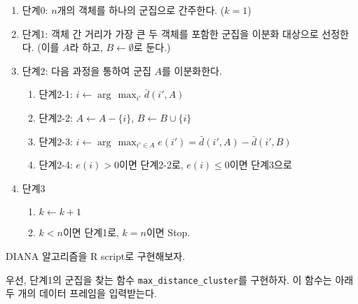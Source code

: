 \documentclass[
]{book}
\providecommand{\tightlist}{%
  \setlength{\itemsep}{0pt}\setlength{\parskip}{0pt}}
\begin{document}
\begin{enumerate}
\def\labelenumi{\arabic{enumi}.}
\tightlist
\item
  단계0: \(n\)개의 객체를 하나의 군집으로 간주한다. (\(k = 1\))
\item
  단계1: 객체 간 거리가 가장 큰 두 객체를 포함한 군집을 이분화 대상으로 선정한다. (이를 \(A\)라 하고, \(B \leftarrow \emptyset\)로 둔다.)
\item
  단계2: 다음 과정을 통하여 군집 \(A\)를 이분화한다.

  \begin{enumerate}
  \def\labelenumii{\arabic{enumii}.}
  \tightlist
  \item
    단계2-1: \(i \leftarrow \arg\,\max_{i'} \bar{d}(i', A)\)
  \item
    단계2-2: \(A \leftarrow A - \{i\}\), \(B \leftarrow B \cup \{i\}\)
  \item
    단계2-3: \(i \leftarrow \arg\,\max_{i' \in A} e(i') = \bar{d}(i', A) - \bar{d}(i', B)\)
  \item
    단계2-4: \(e(i) > 0\)이면 단계2-2로, \(e(i) \le 0\)이면 단계3으로
  \end{enumerate}
\item
  단계3

  \begin{enumerate}
  \def\labelenumii{\arabic{enumii}.}
  \tightlist
  \item
    \(k \leftarrow k + 1\)
  \item
    \(k < n\)이면 단계1로, \(k = n\)이면 Stop.
  \end{enumerate}
\end{enumerate}

DIANA 알고리즘을 R script로 구현해보자.

우선, 단계1의 군집을 찾는 함수 \texttt{max\_distance\_cluster}를 구현하자. 이 함수는 아래 두 개의 데이터 프레임을 입력받는다.
\end{document}
